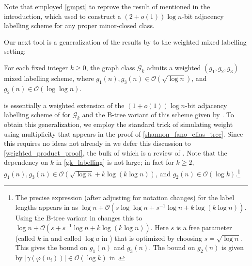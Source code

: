 \documentclass{patmorin}
\renewcommand{\ge}{\geqslant}
\renewcommand{\geq}{\geqslant}
\newcommand{\david}[1]{\noindent{\color{orange} DW: #1}}
\newcommand{\pat}[1]{\noindent\textcolor{Magenta}{PaMo: #1}}
\newcommand{\Oh}{\mathcal{O}}
\begin{document}
Note that \citet{dujmovic.joret.ea:planar} employed \cref{gmpst} to reprove the result of \citet{devos2004} mentioned in the introduction, which \citet{gavoille.labourel:shorter} used to construct a ${(2+o(1))\log n}$-bit adjacency labelling scheme for any proper minor-closed class.



  Our next tool is a generalization of the results by  \citet{dujmovic.esperet.ea:adjacency} to the weighted mixed labelling setting:

  \begin{thm}\label{gk_labelling}
    For each fixed integer $k\ge 0$, the graph class $\mathcal{G}_{k}$
    admits a weighted $(g_1,g_2,g_3)$ mixed labelling scheme, where $g_1(n),g_3(n)\in \Oh(\sqrt{\log n})$, and $g_2(n)\in \Oh(\log\log n)$.
  \end{thm}


  \label{sketch_start}
   is essentially a weighted extension of the $(1+o(1))\log n$-bit adjacency labelling scheme of \citet{dujmovic.esperet.ea:adjacency} for $\mathcal{G}_k$ and the B-tree variant of this scheme given by \citet{gawrychowski.janczewski:simpler}.
  To obtain this generalization, we employ the standard trick of simulating weight using multiplicity that appears in the proof of \cref{shannon_fano_elias_tree}.  Since this requires no ideas not already in \cite{gawrychowski.janczewski:simpler,dujmovic.esperet.ea:adjacency} we defer this discussion to \cref{weighted_product_proof}, the bulk of which is a review of \cite{gawrychowski.janczewski:simpler,dujmovic.esperet.ea:adjacency}.  Note that the dependency on $k$ in \cref{gk_labelling} is not large; in fact for $k\geq2$, $g_1(n),g_3(n)\in \Oh(\sqrt{\log n} + k\log(k\log n))$, and $g_2(n)\in\Oh(\log k)$.\footnote{The precise expression (after adjusting for notation changes) for the label lengths appears in  \cite[Section 5.4]{dujmovic.esperet.ea:adjacency} as $\log n + \Oh(s\log \log n + s^{-1}\log n + k\log (k\log n))$.  Using the B-tree variant in \cite{gawrychowski.janczewski:simpler} changes this to $\log n + \Oh(s + s^{-1}\log n + k\log(k\log n))$.  Here $s$ is a free parameter (called $k$ in \cite{dujmovic.esperet.ea:adjacency} and called $\log a$ in \cite{gawrychowski.janczewski:simpler}) that is optimized by choosing $s=\sqrt{\log n}$. This gives the bound on $g_1(n)$ and $g_3(n)$.  The bound on $g_2(n)$ is given by $|\gamma(\varphi(u_i))|\in \Oh(\log k)$ in  \cite[Section 5.4]{dujmovic.esperet.ea:adjacency}.}
\end{document}
